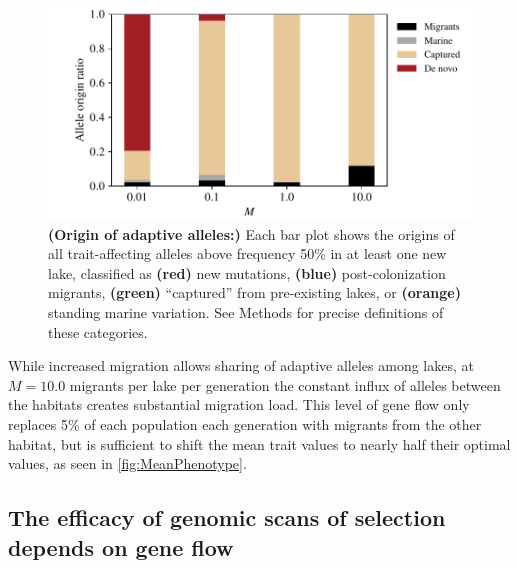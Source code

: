 \documentclass{article}
\begin{document}
\begin{figure}
    \begin{center}
    \includegraphics{Final_Plots/Allele_Origin_2.pdf}
    \caption{ 
        \textbf{(Origin of adaptive alleles:)}
        Each bar plot shows the origins
        of all trait-affecting alleles above frequency 50\% in at least one new lake,
        classified as
        \textbf{(red)} new mutations,
        \textbf{(blue)} post-colonization migrants,
        \textbf{(green)} ``captured'' from pre-existing lakes, or
        \textbf{(orange)} standing marine variation.
        See Methods for precise definitions of these categories.
    } \label{fig:Origin}
    \end{center}
\end{figure}

While increased migration allows sharing of adaptive alleles among lakes, at $M = 10.0$ migrants per lake per generation
the constant influx of alleles between the habitats creates substantial migration load. 
This level of gene flow only replaces 5\% of each population each generation with migrants from the other habitat, 
but is sufficient to shift the mean trait values to nearly half their optimal values, as seen in \autoref{fig:MeanPhenotype}. 


\subsection*{The efficacy of genomic scans of selection depends on gene flow}
\end{document}
